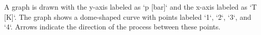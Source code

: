 A graph is drawn with the y-axis labeled as `p [bar]` and the x-axis labeled as `T [K]`. The graph shows a dome-shaped curve with points labeled `1`, `2`, `3`, and `4`. Arrows indicate the direction of the process between these points.